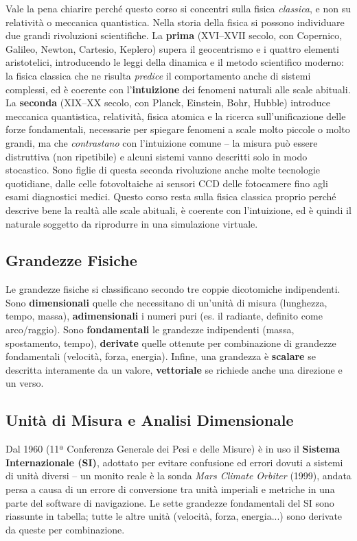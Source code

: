 \documentclass[a4paper,11pt]{article}
\begin{document}
Vale la pena chiarire perché questo corso si concentri sulla fisica \emph{classica}, e non su relatività o meccanica quantistica. Nella storia della fisica si possono individuare due grandi rivoluzioni scientifiche. La \textbf{prima} (XVI--XVII secolo, con Copernico, Galileo, Newton, Cartesio, Keplero) supera il geocentrismo e i quattro elementi aristotelici, introducendo le leggi della dinamica e il metodo scientifico moderno: la fisica classica che ne risulta \emph{predice} il comportamento anche di sistemi complessi, ed è coerente con l'\textbf{intuizione} dei fenomeni naturali alle scale abituali. La \textbf{seconda} (XIX--XX secolo, con Planck, Einstein, Bohr, Hubble) introduce meccanica quantistica, relatività, fisica atomica e la ricerca sull'unificazione delle forze fondamentali, necessarie per spiegare fenomeni a scale molto piccole o molto grandi, ma che \emph{contrastano} con l'intuizione comune -- la misura può essere distruttiva (non ripetibile) e alcuni sistemi vanno descritti solo in modo stocastico. Sono figlie di questa seconda rivoluzione anche molte tecnologie quotidiane, dalle celle fotovoltaiche ai sensori CCD delle fotocamere fino agli esami diagnostici medici. Questo corso resta sulla fisica classica proprio perché descrive bene la realtà alle scale abituali, è coerente con l'intuizione, ed è quindi il naturale soggetto da riprodurre in una simulazione virtuale.

\subsection{Grandezze Fisiche}

Le grandezze fisiche si classificano secondo tre coppie dicotomiche indipendenti. Sono \textbf{dimensionali} quelle che necessitano di un'unità di misura (lunghezza, tempo, massa), \textbf{adimensionali} i numeri puri (es. il radiante, definito come arco/raggio). Sono \textbf{fondamentali} le grandezze indipendenti (massa, spostamento, tempo), \textbf{derivate} quelle ottenute per combinazione di grandezze fondamentali (velocità, forza, energia). Infine, una grandezza è \textbf{scalare} se descritta interamente da un valore, \textbf{vettoriale} se richiede anche una direzione e un verso.

\subsection{Unità di Misura e Analisi Dimensionale}

Dal 1960 (11ª Conferenza Generale dei Pesi e delle Misure) è in uso il \textbf{Sistema Internazionale (SI)}, adottato per evitare confusione ed errori dovuti a sistemi di unità diversi -- un monito reale è la sonda \emph{Mars Climate Orbiter} (1999), andata persa a causa di un errore di conversione tra unità imperiali e metriche in una parte del software di navigazione. Le sette grandezze fondamentali del SI sono riassunte in tabella; tutte le altre unità (velocità, forza, energia...) sono derivate da queste per combinazione.
\end{document}
